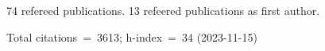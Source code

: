 74 refereed publications. 13 refeered publications as first author.

Total citations~=~3613; h-index~=~34 (2023-11-15)